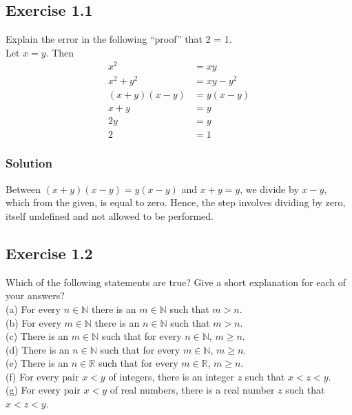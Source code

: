 \documentclass[12pt]{report}
\begin{document}
\tableofcontents
\pagebreak
\chapter{}
\section{Exercise 1.1}
Explain the error in the following ``proof'' that 2 = 1.\\
Let $x = y$. Then
\begin{align*}
    x^2 &= xy\\
    x^2 + y^2 &= xy - y^2\\
    (x + y)(x - y) &= y(x - y)\\
    x + y &= y\\
    2y &= y\\
    2 &= 1
\end{align*}

\subsection*{Solution}
Between \((x + y)(x - y) = y(x - y)\) and \(x + y = y\), we divide by \(x - y\), which from the given, is equal to zero. Hence, the step involves dividing by zero, itself undefined and not allowed to be performed.

\pagebreak
\section{Exercise 1.2}
Which of the following statements are true? Give a short explanation for each of your answers?\\
(a) For every $n \in \mathbb{N}$ there is an $m \in \mathbb{N}$ such that $m > n$.\\
(b) For every $m \in \mathbb{N}$ there is an $n \in \mathbb{N}$ such that $m > n$.\\
(c) There is an $m \in \mathbb{N}$ such that for every $n \in \mathbb{N}$, $m \ge n$.\\
(d) There is an $n \in \mathbb{N}$ such that for every $m \in \mathbb{N}$, $m \ge n$.\\
(e) There is an $n \in \mathbb{R}$ such that for every $m \in \mathbb{R}$, $m \ge n$.\\
(f) For every pair $x < y$ of integers, there is an integer $z$ such that $x < z < y$.\\
(g) For every pair $x < y$ of real numbers, there is a real number $z$ such that $x < z < y$.
\end{document}
